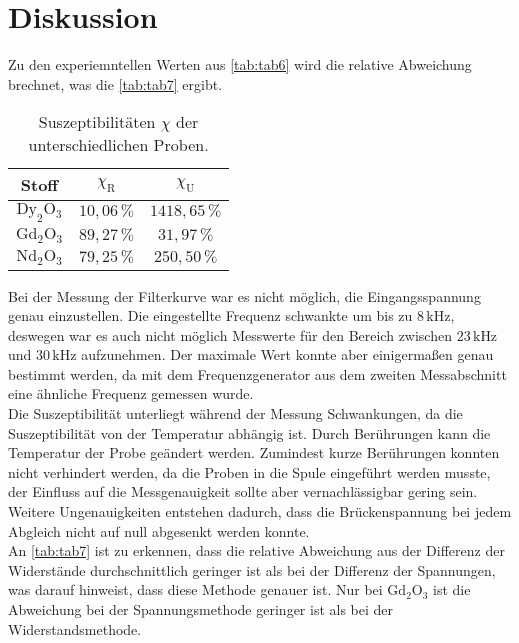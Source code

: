 \section{Diskussion}
\label{sec:Diskussion}

Zu den experiemntellen Werten aus \autoref{tab:tab6} wird die relative Abweichung brechnet, was die \autoref{tab:tab7} ergibt.

\begin{table}[H]
    \centering
    \caption{Suszeptibilitäten $\chi$ der unterschiedlichen Proben.}
    \label{tab:tab7}
    \begin{tabular}{S S S}
      \toprule
       {Stoff} & {$\chi_{\text{R}}$} & {$\chi_{\text{U}}$}  \\
      \midrule
      {$\text{Dy}_2\text{O}_3$}  &{$10,06 \, \%$}    &{$ 1418,65 \, \%$}\\
      {$\text{Gd}_2\text{O}_3$}  &{$89,27 \, \%$}    &{$ 31,97 \, \%$}\\
      {$\text{Nd}_2\text{O}_3$}  &{$79,25 \, \%$}    &{$ 250,50 \, \%$}\\
      \bottomrule
    \end{tabular}
\end{table}

Bei der Messung der Filterkurve war es nicht möglich, die Eingangsspannung genau einzustellen. 
Die eingestellte Frequenz schwankte um bis zu $ 8 \, \unit{\kilo\hertz}$, deswegen war es auch nicht möglich Messwerte für den Bereich zwischen $ 23 \, \unit{\kilo\hertz} $ und $ 30 \, \unit{\kilo\hertz} $  aufzunehmen.
Der maximale Wert konnte aber einigermaßen genau bestimmt werden, da mit dem Frequenzgenerator aus dem zweiten Messabschnitt eine ähnliche Frequenz gemessen wurde. \\

Die Suszeptibilität unterliegt während der Messung Schwankungen, da die Suszeptibilität von der Temperatur abhängig ist. 
Durch Berührungen kann die Temperatur der Probe geändert werden. 
Zumindest kurze Berührungen konnten nicht verhindert werden, da die Proben in die Spule eingeführt werden musste, der Einfluss auf die Messgenauigkeit sollte aber vernachlässigbar gering sein. \\
Weitere Ungenauigkeiten entstehen  dadurch, dass die Brückenspannung bei jedem Abgleich nicht auf null abgesenkt werden konnte. \\

An \autoref{tab:tab7} ist zu erkennen, dass die relative Abweichung aus der Differenz der Widerstände durchschnittlich geringer ist als bei der Differenz der Spannungen, was darauf hinweist, dass diese Methode genauer ist.
Nur bei $\text{Gd}_2\text{O}_3$ ist die Abweichung bei der Spannungsmethode geringer ist als bei der Widerstandsmethode.
